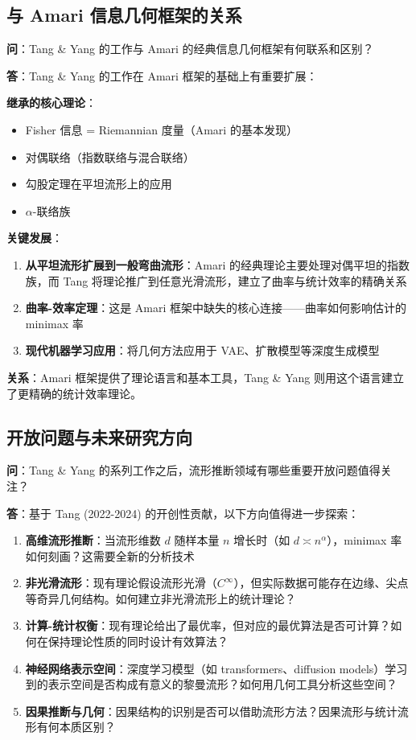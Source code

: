 \subsection{与 Amari 信息几何框架的关系}\label{sec:qa-amari-framework}

\textbf{问}：Tang \& Yang 的工作与 Amari 的经典信息几何框架有何联系和区别？

\textbf{答}：Tang \& Yang 的工作在 Amari 框架的基础上有重要扩展：

\textbf{继承的核心理论}：
\begin{itemize}
    \item Fisher 信息 = Riemannian 度量（Amari 的基本发现）
    \item 对偶联络（指数联络与混合联络）
    \item 勾股定理在平坦流形上的应用
    \item $\alpha$-联络族
\end{itemize}

\textbf{关键发展}：
\begin{enumerate}
    \item \textbf{从平坦流形扩展到一般弯曲流形}：Amari 的经典理论主要处理对偶平坦的指数族，而 Tang 将理论推广到任意光滑流形，建立了曲率与统计效率的精确关系
    \item \textbf{曲率-效率定理}：这是 Amari 框架中缺失的核心连接——曲率如何影响估计的 minimax 率
    \item \textbf{现代机器学习应用}：将几何方法应用于 VAE、扩散模型等深度生成模型
\end{enumerate}

\textbf{关系}：Amari 框架提供了理论语言和基本工具，Tang \& Yang 则用这个语言建立了更精确的统计效率理论。

\subsection{开放问题与未来研究方向}\label{sec:qa-open-problems}

\textbf{问}：Tang \& Yang 的系列工作之后，流形推断领域有哪些重要开放问题值得关注？

\textbf{答}：基于 Tang (2022-2024) 的开创性贡献，以下方向值得进一步探索：

\begin{enumerate}
    \item \textbf{高维流形推断}：当流形维数 $d$ 随样本量 $n$ 增长时（如 $d \asymp n^\alpha$），minimax 率如何刻画？这需要全新的分析技术
    \item \textbf{非光滑流形}：现有理论假设流形光滑（$C^\infty$），但实际数据可能存在边缘、尖点等奇异几何结构。如何建立非光滑流形上的统计理论？
    \item \textbf{计算-统计权衡}：现有理论给出了最优率，但对应的最优算法是否可计算？如何在保持理论性质的同时设计有效算法？
    \item \textbf{神经网络表示空间}：深度学习模型（如 transformers、diffusion models）学习到的表示空间是否构成有意义的黎曼流形？如何用几何工具分析这些空间？
    \item \textbf{因果推断与几何}：因果结构的识别是否可以借助流形方法？因果流形与统计流形有何本质区别？
\end{enumerate}

